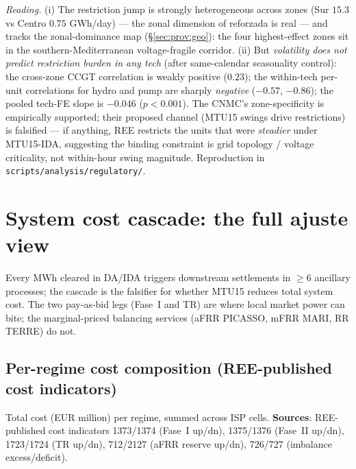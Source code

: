 \documentclass[11pt,a4paper]{article}
\begin{document}
\textit{Reading.} (i) The restriction jump is strongly heterogeneous across zones (Sur $15.3$ vs Centro $0.75$ GWh/day) --- the zonal dimension of reforzada is real --- and tracks the zonal-dominance map (\S\ref{sec:prov:geo}): the four highest-effect zones sit in the southern-Mediterranean voltage-fragile corridor. (ii) But \emph{volatility does not predict restriction burden in any tech} (after same-calendar seasonality control): the cross-zone CCGT correlation is weakly positive ($0.23$); the within-tech per-unit correlations for hydro and pump are sharply \emph{negative} ($-0.57$, $-0.86$); the pooled tech-FE slope is $-0.046$ ($p\!<\!0.001$). The CNMC's zone-specificity is empirically supported; their proposed channel (MTU15 swings drive restrictions) is falsified --- if anything, REE restricts the units that were \emph{steadier} under MTU15-IDA, suggesting the binding constraint is grid topology / voltage criticality, not within-hour swing magnitude. Reproduction in \texttt{scripts/analysis/regulatory/}.


\section{System cost cascade: the full ajuste view}\label{sec:prov:full_cascade}

\noindent Every MWh cleared in DA/IDA triggers downstream settlements in $\ge 6$ ancillary processes; the cascade is the falsifier for whether MTU15 reduces total system cost. The two pay-as-bid legs (Fase~I and TR) are where local market power can bite; the marginal-priced balancing services (aFRR PICASSO, mFRR MARI, RR TERRE) do not.

\subsection{Per-regime cost composition (REE-published cost indicators)}\label{sec:prov:full_cascade:costs}

\noindent Total cost (EUR million) per regime, summed across ISP cells. \textbf{Sources}: REE-published cost indicators 1373/1374 (Fase~I up/dn), 1375/1376 (Fase~II up/dn), 1723/1724 (TR up/dn), 712/2127 (aFRR reserve up/dn), 726/727 (imbalance excess/deficit).

\begin{table}[H]
\centering\scriptsize
\caption{\textbf{Per-regime ajuste-cascade cost composition.} EUR \emph{million} per regime, summed across ISP-15 cells. Negative TR (dn) values reflect REE paying providers to come down. Per-day evolution of the same components in Figure~\ref{fig:cascade_costs_timeseries}.}
\label{tab:cascade_costs_official}
\setlength{\tabcolsep}{4pt}

\end{table}
\end{document}
